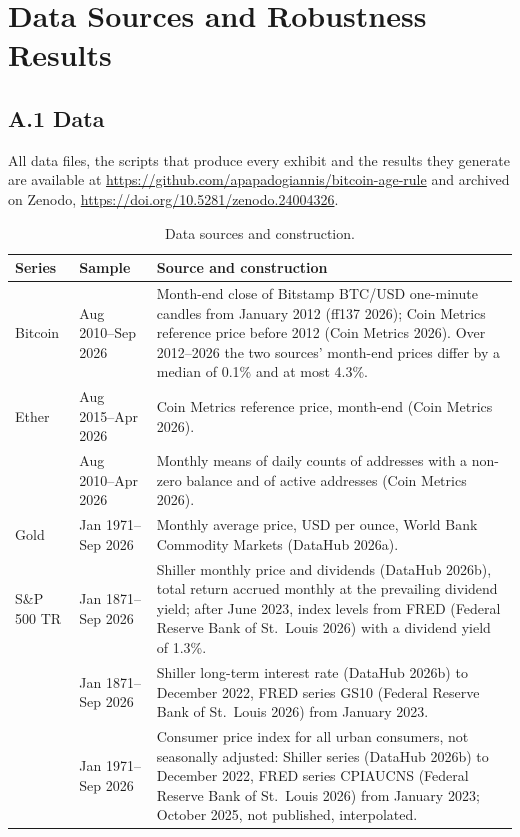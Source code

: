 \documentclass[12pt]{article}
\renewcommand{\thetable}{\arabic{figure}}
\DeclareRobustCommand{\chg}[1]{{\color{blue}#1}}
\theoremstyle{plain}
\theoremstyle{remark}
\begin{document}
\section{\texorpdfstring{\chg{Data Sources and Robustness Results}}{Data Sources and Robustness Results}}
\setcounter{figure}{0}\renewcommand{\thetable}{A\arabic{figure}}
\begingroup\color{blue}

\subsection*{A.1 Data}

All data files, the scripts that produce every exhibit and the results they generate are available at \url{https://github.com/apapadogiannis/bitcoin-age-rule} and archived on Zenodo, \url{https://doi.org/10.5281/zenodo.24004326}.

\begin{table}[H]
\centering\color{blue}
\caption{Data sources and construction.}
\label{tab:D1}
\footnotesize
\begin{tabularx}{\textwidth}{>{\raggedright\arraybackslash}p{2.4cm}>{\raggedright\arraybackslash}p{2.6cm}>{\raggedright\arraybackslash}X}
\toprule
Series & Sample & Source and construction\\
\midrule
Bitcoin & Aug 2010--Sep 2026 & Month-end close of Bitstamp BTC/USD one-minute candles from January 2012 (ff137 2026); Coin Metrics reference price before 2012 (Coin Metrics 2026). Over 2012--2026 the two sources' month-end prices differ by a median of 0.1\% and at most 4.3\%.\\
Ether & Aug 2015--Apr 2026 & Coin Metrics reference price, month-end (Coin Metrics 2026).\\
\chg{Bitcoin addresses} & \chg{Aug 2010--Apr 2026} & \chg{Monthly means of daily counts of addresses with a non-zero balance and of active addresses (Coin Metrics 2026).}\\
Gold & Jan 1971--Sep 2026 & Monthly average price, USD per ounce, World Bank Commodity Markets (DataHub 2026a).\\
S\&P 500 TR & Jan 1871--Sep 2026 & Shiller monthly price and dividends (DataHub 2026b), total return accrued monthly at the prevailing dividend yield; after June 2023, index levels from FRED (Federal Reserve Bank of St.\ Louis 2026) with a dividend yield of 1.3\%.\\
\chg{Ten-year Treasury yield} & \chg{Jan 1871--Sep 2026} & \chg{Shiller long-term interest rate (DataHub 2026b) to December 2022, FRED series GS10 (Federal Reserve Bank of St.\ Louis 2026) from January 2023.}\\
\chg{US consumer prices} & \chg{Jan 1971--Sep 2026} & \chg{Consumer price index for all urban consumers, not seasonally adjusted: Shiller series (DataHub 2026b) to December 2022, FRED series CPIAUCNS (Federal Reserve Bank of St.\ Louis 2026) from January 2023; October 2025, not published, interpolated.}\\
\bottomrule
\end{tabularx}
\end{table}
\end{document}
